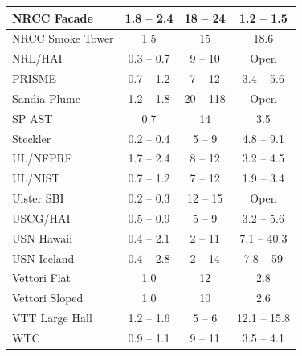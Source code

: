 \begin{table}[!t]
\begin{tabular}{|l|c|c|c|}
NRCC Facade         & 1.8 -- 2.4    & 18 -- 24      & 1.2 -- 1.5    \\ \hline
NRCC Smoke Tower    & 1.5           & 15            & 18.6          \\ \hline
NRL/HAI             & 0.3 -- 0.7    & 9 -- 10       & Open          \\ \hline
PRISME              & 0.7 -- 1.2    & 7 -- 12       & 3.4 -- 5.6    \\ \hline
Sandia Plume        & 1.2 -- 1.8    & 20 -- 118     & Open          \\ \hline
SP AST              & 0.7           & 14            & 3.5           \\ \hline
Steckler            & 0.2 -- 0.4    & 5 -- 9        & 4.8 -- 9.1    \\ \hline
UL/NFPRF            & 1.7 -- 2.4    & 8 -- 12       & 3.2 -- 4.5    \\ \hline
UL/NIST             & 0.7 -- 1.2    & 7 -- 12       & 1.9 -- 3.4    \\ \hline
Ulster SBI          & 0.2 -- 0.3    & 12 -- 15      & Open          \\ \hline
USCG/HAI            & 0.5 -- 0.9    & 5 -- 9        & 3.2 -- 5.6    \\ \hline
USN Hawaii          & 0.4 -- 2.1    & 2 -- 11       & 7.1 -- 40.3   \\ \hline
USN Iceland         & 0.4 -- 2.8    & 2 -- 14       & 7.8 -- 59     \\ \hline
Vettori Flat        & 1.0           & 12            & 2.8           \\ \hline
Vettori Sloped      & 1.0           & 10            & 2.6           \\ \hline
VTT Large Hall      & 1.2 -- 1.6    & 5 -- 6        & 12.1 -- 15.8  \\ \hline
WTC                 & 0.9 -- 1.1    & 9 -- 11       & 3.5 -- 4.1    \\ \hline
\end{tabular}
\label{Numerical_Parameters}
\nopagebreak
\end{table}






